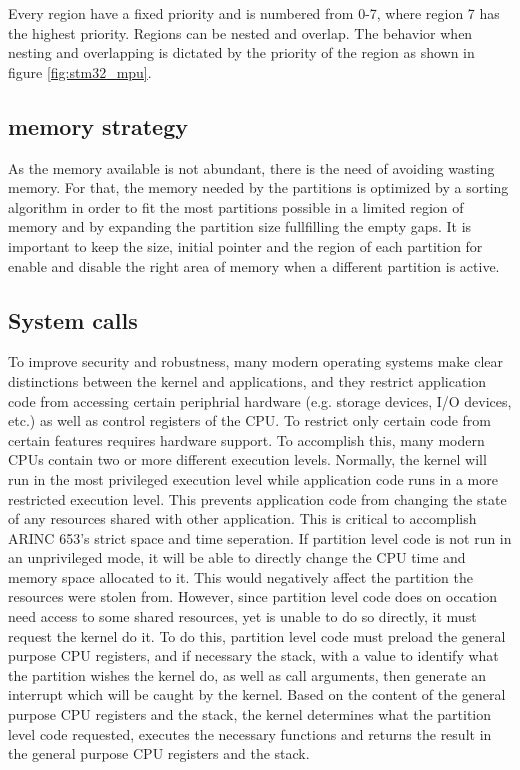 Every region have a fixed priority and is numbered from 0-7, where region 7 has the highest priority.
Regions can be nested and overlap.
The behavior when nesting and overlapping is dictated by the priority of the region as shown in figure \ref{fig:stm32_mpu}.

\subsection{memory strategy}
As the memory available is not abundant, there is the need of avoiding wasting memory. For that, the memory needed by the partitions is optimized by a sorting algorithm in order to fit 
the most partitions possible in a limited region of memory and by expanding the partition size fullfilling 
the empty gaps. It is important to keep the size, initial pointer and the region of each partition for enable and disable the right area of memory when a different partition is active.

\subsection{System calls}
To improve security and robustness, many modern operating systems make clear 
distinctions between the kernel and applications, and they restrict application
code from accessing certain periphrial hardware (e.g. storage devices, I/O
devices, etc.) as well as control registers of the CPU. 
To restrict only certain code from certain features requires hardware support.
To accomplish this, many modern CPUs contain two or more different execution
levels. Normally, the kernel will run in the most privileged execution level
while application code runs in a more restricted execution level. This prevents
application code from changing the state of any resources shared with other
application. This is critical to accomplish ARINC 653's strict space and time 
seperation. If partition level code is not run in an unprivileged mode, it will
be able to directly change the CPU time and memory space allocated to it. This
would negatively affect the partition the resources were stolen from. However,
since partition level code does on occation need access to some shared resources,
yet is unable to do so directly, it must request the kernel do it. To do this,
partition level code must preload the general purpose CPU registers, and if
necessary the stack, with a value to identify what the partition wishes the
kernel do, as well as call arguments, then generate an interrupt which will be
caught by the kernel. Based on the content of the general purpose CPU registers
and the stack, the kernel determines what the partition level code requested,
executes the necessary functions and returns the result in the general purpose 
CPU registers and the stack.

